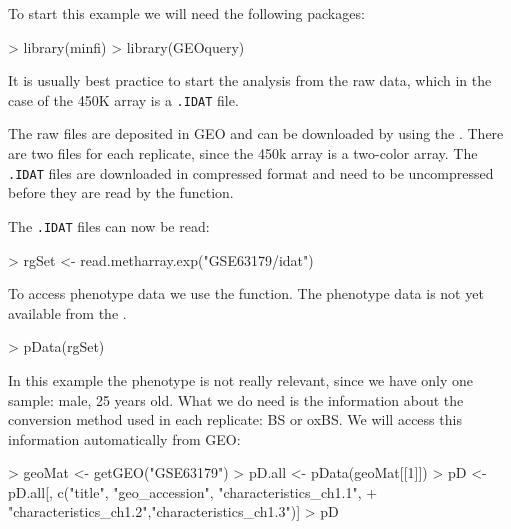 \documentclass{article}
\begin{document}
To start this example we will need the following packages:
\begin{Schunk}
\begin{Sinput}
> library(minfi)
> library(GEOquery)
\end{Sinput}
\end{Schunk}


It is usually best practice to start the analysis from the raw data, which in the case of the 450K array is a \verb|.IDAT| file.

The raw files are deposited in GEO and can be downloaded by using the . There are two files for each replicate, since the 450k array is a two-color array. The \verb|.IDAT| files are downloaded in compressed format and need to be uncompressed before they are read by the  function.

\begin{Schunk}
\end{Schunk}

The \verb|.IDAT| files can now be read:
\begin{Schunk}
\begin{Sinput}
> rgSet <- read.metharray.exp("GSE63179/idat")
\end{Sinput}
\end{Schunk}

To access phenotype data we use the  function. The phenotype data is not yet available from the .
\begin{Schunk}
\begin{Sinput}
> pData(rgSet)
\end{Sinput}
\end{Schunk}
In this example the phenotype is not really relevant, since we have only one sample: male, 25 years old. What we do need is the information about the conversion method used in each replicate: BS or oxBS. We will access this information automatically from GEO:
\begin{Schunk}
\begin{Sinput}
> geoMat <- getGEO("GSE63179")
> pD.all <- pData(geoMat[[1]])
> pD <- pD.all[, c("title", "geo_accession", "characteristics_ch1.1",
+                  "characteristics_ch1.2","characteristics_ch1.3")]
> pD
\end{Sinput}
\end{Schunk}
\end{document}
